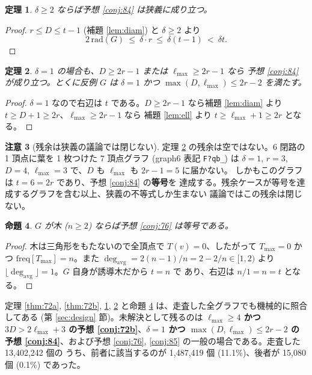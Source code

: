 \documentclass[paper=a4,fontsize=10.5pt,jafontsize=10.5pt]{jlreq}
\theoremstyle{plain}
\newtheorem{theorem}{定理}[section]
\newtheorem{proposition}[theorem]{命題}
\theoremstyle{definition}
\newtheorem{remark}[theorem]{注意}
\begin{document}
\begin{theorem}\label{thm:84}
$\delta \ge 2$ ならば予想 \ref{conj:84} は狭義に成り立つ。
\end{theorem}

\begin{proof}
$r \le D \le t - 1$ (補題 \ref{lem:diam}) と $\delta \ge 2$ より
\[ 2\,\mathrm{rad}(G) \ \le \ \delta \cdot r \ \le \ \delta (t-1)
   \ < \ \delta t . \]
\end{proof}

\begin{theorem}\label{thm:84d1}
$\delta = 1$ の場合も、$D \ge 2r - 1$ または $\ell_{\max} \ge 2r - 1$ なら
予想 \ref{conj:84} が成り立つ。とくに反例 $G$ は $\delta = 1$ かつ
$\max(D, \ell_{\max}) \le 2r - 2$ を満たす。
\end{theorem}

\begin{proof}
$\delta = 1$ なので右辺は $t$ である。$D \ge 2r - 1$ なら補題
\ref{lem:diam} より $t \ge D + 1 \ge 2r$、$\ell_{\max} \ge 2r - 1$ なら
補題 \ref{lem:ell} より $t \ge \ell_{\max} + 1 \ge 2r$ となる。
\end{proof}

\begin{remark}[残余は狭義の議論では閉じない]\label{rem:84resid}
定理 \ref{thm:84d1} の残余は空ではない。$6$ 閉路の 1 頂点に葉を 1 枚つけた
$7$ 頂点グラフ (graph6 表記 \texttt{F?qb\_}) は $\delta = 1$, $r = 3$, $D = 4$,
$\ell_{\max} = 3$ で、$D$ も $\ell_{\max}$ も $2r - 1 = 5$ に届かない。
しかもこのグラフは $t = 6 = 2r$ であり、予想 \ref{conj:84} の\textbf{等号}を
達成する。残余ケースが等号を達成するグラフを含む以上、狭義の不等式しか生まない
議論ではこの残余は閉じない。
\end{remark}

\begin{proposition}\label{prop:76tree}
$G$ が木 ($n \ge 2$) ならば予想 \ref{conj:76} は等号である。
\end{proposition}

\begin{proof}
木は三角形をもたないので全頂点で $T(v) = 0$、したがって $T_{\max} = 0$ かつ
$\mathrm{freq}[T_{\max}] = n$。また
$\deg_{\mathrm{avg}} = 2(n-1)/n = 2 - 2/n \in [1, 2)$ より
$\lfloor \deg_{\mathrm{avg}} \rfloor = 1$。$G$ 自身が誘導木だから $t = n$ で
あり、右辺は $n/1 = n = t$ となる。
\end{proof}

定理 \ref{thm:72a}, \ref{thm:72b}, \ref{thm:84}, \ref{thm:84d1} と命題
\ref{prop:76tree} は、走査した全グラフでも機械的に照合してある
(第 \ref{sec:design} 節)。未解決として残るのは
\textbf{$\ell_{\max} \ge 4$ かつ $3D > 2\ell_{\max} + 3$ の予想
\ref{conj:72b}}、\textbf{$\delta = 1$ かつ
$\max(D, \ell_{\max}) \le 2r - 2$ の予想 \ref{conj:84}}、および予想
\ref{conj:76}, \ref{conj:85} の一般の場合である。走査した 13,402,242 個の
うち、前者に該当するのが 1,487,419 個 (11.1\%)、後者が 15,080 個
(0.1\%) であった。
\end{document}
